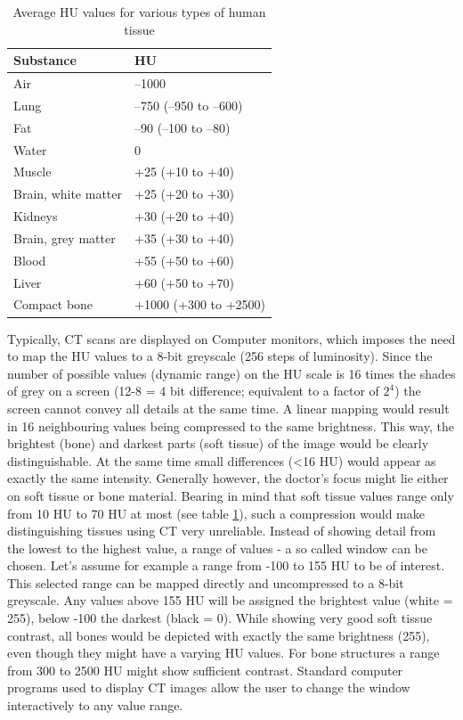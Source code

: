 \begin{table}[]
	\centering
	\caption{Average HU values for various types of human tissue}
	\label{tab:HU}
	\begin{tabular}{@{}ll@{}}
		\toprule
		Substance           & HU                     \\ \midrule
		Air                 & –1000                  \\
		Lung                & –750 (–950 to –600)    \\
		Fat                 & –90 (–100 to –80)      \\
		Water               & 0                      \\
		Muscle              & +25 (+10 to +40)       \\
		Brain, white matter & +25 (+20 to +30)       \\
		Kidneys             & +30 (+20 to +40)       \\
		Brain, grey matter  & +35 (+30 to +40)       \\
		Blood               & +55 (+50 to +60)       \\
		Liver               & +60 (+50 to +70)       \\
		Compact bone        & +1000 (+300 to +2500)  \\ \bottomrule
	\end{tabular}
\end{table}

Typically, CT scans are displayed on Computer monitors, which imposes the need to map the HU values to a 8-bit greyscale (256 steps of luminosity).
Since the number of possible values (dynamic range) on the HU scale is 16 times the shades of grey on a screen (12-8 = 4 bit difference; equivalent to a factor of $2^4$) the screen cannot convey all details at the same time.
A linear mapping would result in 16 neighbouring values being compressed to the same brightness.
This way, the brightest (bone) and darkest parts (soft tissue) of the image would be clearly distinguishable.
At the same time small differences (<16 HU) would appear as exactly the same intensity.
Generally however, the doctor's focus might lie either on soft tissue or bone material.
Bearing in mind that soft tissue values range only from 10 HU to 70 HU at most (see table \ref{tab:HU}), such a compression would make distinguishing tissues using CT very unreliable.
Instead of showing detail from the lowest to the highest value, a range of values - a so called window can be chosen.
Let's assume for example a range from -100 to 155 HU to be of interest.
This selected range can be mapped directly and uncompressed to a 8-bit greyscale.
Any values above 155 HU will be assigned the brightest value (white = 255), below -100 the darkest (black = 0).
While showing very good soft tissue contrast, all bones would be depicted with exactly the same brightness (255), even though they might have a varying HU values.
For bone structures a range from 300 to 2500 HU might show sufficient contrast.
Standard computer programs used to display CT images allow the user to change the window interactively to any value range. \cite{Podgorsak, Maidment2014}

